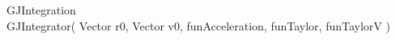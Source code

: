 \documentclass[10pt]{article}
\begin{document}
GJIntegration\\
GJIntegrator( Vector r0, Vector v0, funAcceleration, funTaylor, funTaylorV )
\end{document}
